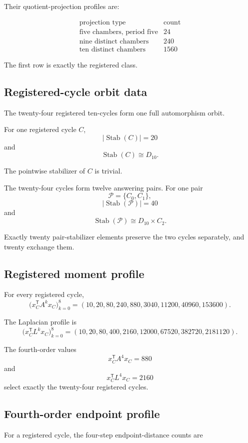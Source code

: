 Their quotient-projection profiles are:

\[
\begin{array}{c|r}
\text{projection type} & \text{count}\\
\hline
\text{five chambers, period five} & 24\\
\text{nine distinct chambers} & 240\\
\text{ten distinct chambers} & 1560
\end{array}
\]

The first row is exactly the registered class.

\subsection{Registered-cycle orbit data}

The twenty-four registered ten-cycles form one full automorphism orbit.

For one registered cycle \(C\),
\[
|\operatorname{Stab}(C)|=20
\]
and
\[
\operatorname{Stab}(C)\cong D_{10}.
\]

The pointwise stabilizer of \(C\) is trivial.

The twenty-four cycles form twelve answering pairs. For one pair
\[
\mathcal P=\{C_0,C_1\},
\]
\[
|\operatorname{Stab}(\mathcal P)|=40
\]
and
\[
\operatorname{Stab}(\mathcal P)
\cong
D_{10}\times C_2.
\]

Exactly twenty pair-stabilizer elements preserve the two cycles
separately, and twenty exchange them.

\subsection{Registered moment profile}

For every registered cycle,
\[
\bigl(x_C^{\mathsf T}A^k x_C\bigr)_{k=0}^{8}
=
(10,20,80,240,880,3040,11200,40960,153600).
\]

The Laplacian profile is
\[
\bigl(x_C^{\mathsf T}L^k x_C\bigr)_{k=0}^{8}
=
(10,20,80,400,2160,12000,67520,382720,2181120).
\]

The fourth-order values
\[
x_C^{\mathsf T}A^4x_C=880
\]
and
\[
x_C^{\mathsf T}L^4x_C=2160
\]
select exactly the twenty-four registered cycles.

\subsection{Fourth-order endpoint profile}

For a registered cycle, the four-step endpoint-distance counts are

